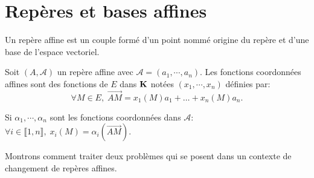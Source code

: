 \section{Repères et bases affines}
\begin{defi} 
  Un repère affine est un couple formé d'un point nommé origine du repère et d'une base de l'espace vectoriel.
\end{defi}
\begin{defi}
  Soit $\left( A, \mathcal{A}\right)$ un repère affine avec $\mathcal{A} = (a_1, \cdots, a_n)$. Les fonctions coordonnées affines sont des fonctions de $E$ dans $\mathbf{K}$ notées $(x_1, \cdots, x_n)$ définies par:
\[
  \forall M \in E, \; \overrightarrow{AM} = x_1(M) a_1 + \dots + x_n(M) a_n.
\]
\end{defi}
\begin{rem}
   Si $\alpha_1, \cdots, \alpha_n$ sont les fonctions coordonnées dans $\mathcal{A}$: $\forall i \in \llbracket 1,n \rrbracket, \; x_i(M) = \alpha_i(\overrightarrow{AM})$.
\end{rem}
\noindent
Montrons comment traiter deux problèmes qui se posent dans un contexte de changement de repères affines.
 
